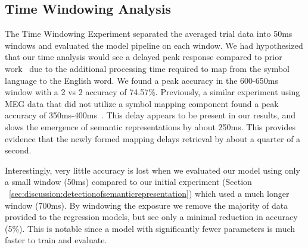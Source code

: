 
\subsection{Time Windowing Analysis}
The Time Windowing Experiment separated the averaged trial data into 50ms windows and evaluated the model pipeline on each window. We had hypothesized that our time analysis would see a delayed peak response compared to prior work~\cite{Sudre2012} due to the additional processing time required to map from the symbol language to the English word. We found a peak accuracy in the 600-650ms window with a 2 vs 2 accuracy of 74.57\%. Previously, a similar experiment using MEG data that did not utilize a symbol mapping component found a peak accuracy of 350ms-400ms~\cite{Sudre2012}. This delay appears to be present in our results, and slows the emergence of semantic representations by about 250ms. This provides evidence that the newly formed mapping delays retrieval by about a quarter of a second.

Interestingly, very little \tvt accuracy is lost when we evaluated our model using only a small window (50ms) compared to our initial experiment (Section ~\ref{sec:discussion:detectionofsemanticrepresentation}) which used a much longer window (700ms). By windowing the exposure we remove the majority of data provided to the regression models, but see only a minimal reduction in accuracy (5\%). This is notable since a model with significantly fewer parameters is much faster to train and evaluate.

